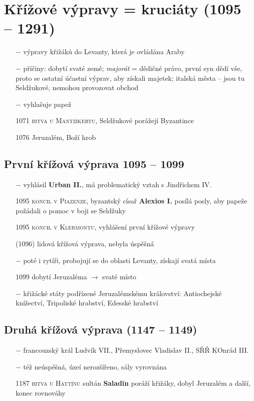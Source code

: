 \documentclass{article}
\begin{document}
\section*{Křížové výpravy = kruciáty (1095 -- 1291)}
\begin{itemize}
    \vspace{-0.5em}
    \setlength\itemsep{0.15em}
    \item[$-$] výpravy křižáků do Levanty, která je ovládána Araby
    \item[$-$] příčiny: dobytí svaté země; \textit{majorát} = dědičné právo, první syn dědí vše, proto se ostatní účastní výprav, aby získali majetek; italská města -- jsou tu Seldžukové, nemohou provozovat obchod
    \item[$-$] vyhlašuje papež
    \item[1071] \textsc{bitva u Mantzikertu}, Seldžukové porážejí Byzantince
    \item[1076] Jeruzalém, Boží hrob
\end{itemize}

\subsection*{První křížová výprava 1095 -- 1099}
\begin{itemize}
    \vspace{-0.5em}
    \setlength\itemsep{0.15em}
    \item[$-$] vyhlásil \textbf{Urban II.}, má problematický vztah s Jindřichem IV.
    \item[1095] \textsc{koncil v Piazenze}, byzantský císař \textbf{Alexios I.} posílá posly, aby papeže požádali o pomoc v boji se Seldžuky
    \item[1095] \textsc{koncil v Klermontu}, vyhlášení první křížové výpravy
    \item[(1096)] lidová křížová výprava, nebyla úspěšná
    \item[$-$] poté i rytíři, probojují se do oblasti Levanty, získají svatá místa
    \item[1099] dobytí Jeruzaléma $\rightarrow$ svaté místo
    \item[$-$] křižácké státy podřízené Jeruzalémskému království: Antiochejské knížectví, Tripoliské hrabství, Edesské hrabství
\end{itemize}

\subsection*{Druhá křížová výprava (1147 -- 1149)}
\begin{itemize}
    \vspace{-0.5em}
    \setlength\itemsep{0.15em}
    \item[$-$] francouzský král Ludvík VII., Přemyslovec Vladislav II., SŘŘ KOnrád III.
    \item[$-$] též neúspěšná, úzeí nerozšířeno, sály vyrovnána
    \item[1187] \textsc{bitva u Hattínu} sultán \textbf{Saladin} poráží křižáky, dobyl Jeruzalém a další, konec rovnováhy
\end{itemize}
\end{document}
